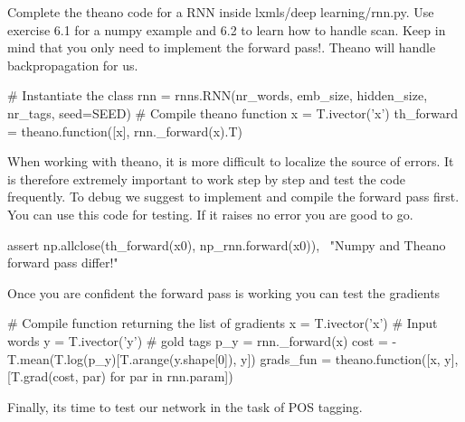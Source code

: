 \begin{exercise}
Complete the theano code for a RNN inside lxmls/deep learning/rnn.py. Use
exercise 6.1 for a numpy example and 6.2 to learn how to handle scan. Keep in
mind that you only need to implement the forward pass!. Theano will handle
backpropagation for us. 
\begin{python}
# Instantiate the class
rnn = rnns.RNN(nr_words, emb_size, hidden_size, nr_tags, seed=SEED)
# Compile theano function
x = T.ivector('x')
th_forward = theano.function([x], rnn._forward(x).T)
\end{python}
When working with theano, it is more difficult to localize the source of
errors. It is therefore extremely important to work step by step and test the
code frequently. To debug we suggest to implement and compile the forward pass
first. You can use this code for testing. If it raises no error you are good to
go.
\begin{python}
assert np.allclose(th_forward(x0), np_rnn.forward(x0)), \
    "Numpy and Theano forward pass differ!"
\end{python}
Once you are confident the forward pass is working you can test the gradients
\begin{python}
# Compile function returning the list of gradients
x = T.ivector('x')     # Input words
y = T.ivector('y')     # gold tags 
p_y = rnn._forward(x)
cost = -T.mean(T.log(p_y)[T.arange(y.shape[0]), y])
grads_fun = theano.function([x, y], [T.grad(cost, par) for par in rnn.param])
\end{python}
Finally, its time to test our network in the task of POS tagging. 


\end{exercise}
